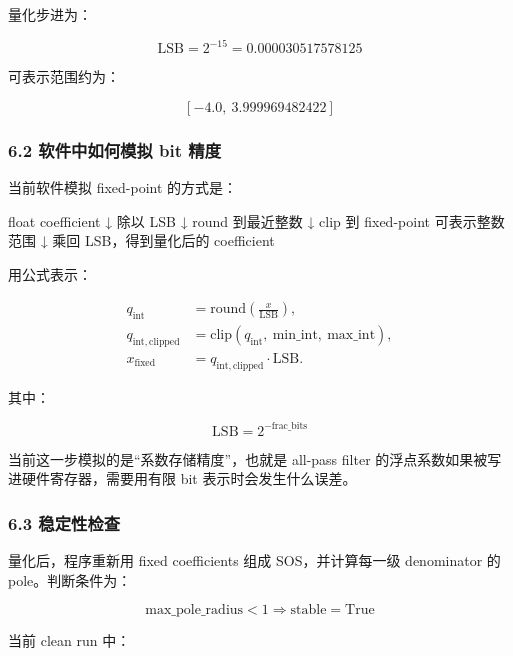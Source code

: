 \documentclass[
]{ctexart}
\newenvironment{Shaded}{}{}
\newcommand{\NormalTok}[1]{#1}
\begin{document}
量化步进为：

\[
\mathrm{LSB}=2^{-15}=0.000030517578125
\]

可表示范围约为：

\[
[-4.0,\ 3.999969482422]
\]

\subsubsection{6.2 软件中如何模拟 bit
精度}\label{ux8f6fux4ef6ux4e2dux5982ux4f55ux6a21ux62df-bit-ux7cbeux5ea6}

当前软件模拟 fixed-point 的方式是：

\begin{Shaded}
\begin{Highlighting}[]
\NormalTok{float coefficient}
\NormalTok{    ↓}
\NormalTok{除以 LSB}
\NormalTok{    ↓}
\NormalTok{round 到最近整数}
\NormalTok{    ↓}
\NormalTok{clip 到 fixed{-}point 可表示整数范围}
\NormalTok{    ↓}
\NormalTok{乘回 LSB，得到量化后的 coefficient}
\end{Highlighting}
\end{Shaded}

用公式表示：

\[
\begin{aligned}
q_{\mathrm{int}} &= \mathrm{round}\!\left(\frac{x}{\mathrm{LSB}}\right),\\
q_{\mathrm{int,clipped}} &= \mathrm{clip}(q_{\mathrm{int}},\ \mathrm{min\_int},\ \mathrm{max\_int}),\\
x_{\mathrm{fixed}} &= q_{\mathrm{int,clipped}}\cdot \mathrm{LSB}.
\end{aligned}
\]

其中：

\[
\mathrm{LSB}=2^{-\mathrm{frac\_bits}}
\]

当前这一步模拟的是``系数存储精度''，也就是 all-pass filter
的浮点系数如果被写进硬件寄存器，需要用有限 bit 表示时会发生什么误差。

\subsubsection{6.3 稳定性检查}\label{ux7a33ux5b9aux6027ux68c0ux67e5}

量化后，程序重新用 fixed coefficients 组成 SOS，并计算每一级 denominator
的 pole。判断条件为：

\[
\mathrm{max\_pole\_radius}<1\Rightarrow \mathrm{stable}=\mathrm{True}
\]

当前 clean run 中：
\end{document}
